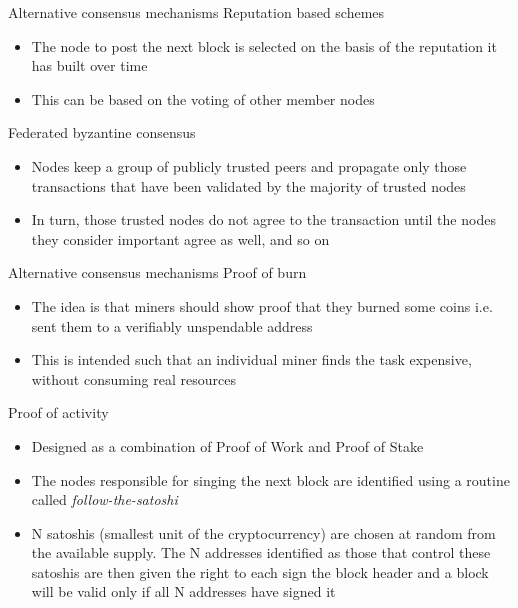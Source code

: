 \documentclass[9pt]{beamer}
\begin{document}
\begin{frame}{Alternative consensus mechanisms}
	Reputation based schemes
	\begin{itemize}
		\item The node to post the next block is selected on the basis of the reputation it has built over time
		\item This can be based on the voting of other member nodes
	\end{itemize}
	Federated byzantine consensus
	\begin{itemize}
		\item Nodes keep a group of publicly trusted peers and propagate only those transactions that have been validated by the majority of trusted nodes
		\item In turn, those trusted nodes do not agree to the transaction until the nodes they consider important agree as well, and so on
	\end{itemize}
\end{frame}


\begin{frame}{Alternative consensus mechanisms}
	Proof of burn
	\begin{itemize}
		\item The idea is that miners should show proof that they burned some coins i.e. sent them to a verifiably unspendable address
		\item This is intended such that an individual miner finds the task expensive, without consuming real resources
	\end{itemize}
	Proof of activity
	\begin{itemize}
		\item Designed as a combination of Proof of Work and Proof of Stake
		\item The nodes responsible for singing the next block are identified using a routine called \textit{follow-the-satoshi}
		\item N satoshis (smallest unit of the cryptocurrency) are chosen at random from the available supply. The N addresses identified as those that control these satoshis are then given the right to each sign the block header and a block will be valid only if all N addresses have signed it
	\end{itemize}
\end{frame}

\end{document}
